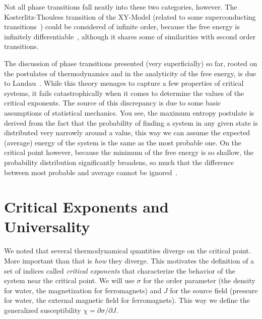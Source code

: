 Not all phase transitions fall neatly into these two categories, however. The
Kosterlitz-Thouless transition of the XY-Model (related to some superconducting
transitions~\cite{Resnick1981}) could be considered of infinite order, because
the free energy is infinitely differentiable~\cite{Kosterlitz1973}, although it
shares some of similarities with second order transitions.

The discussion of phase transitions presented (very superficially) so far,
rooted on the postulates of thermodynamics and in the analyticity of the free
energy, is due to Landau~\cite{Landau1969}. While this theory menages to
capture a few properties of critical systems, it fails catastrophically when it
comes to determine the values of the critical exponents. The source of this
discrepancy is due to some basic assumptions of statistical mechanics. You see,
the maximum entropy postulate is derived from the fact that the probability of
finding a system in any given state is distributed very narrowly around a
value, this way we can assume the expected (average) energy of the system is
the same as the most probable one. On the critical point however, because
the minimum of the free energy is so shallow, the probability distribution
significantly broadens, so much that the difference between most probable and
average cannot be ignored~\cite{Callen1985}.



\section{Critical Exponents and Universality}
\label{sec:universality}
\newcommand{\op}{\sigma}
\newcommand{\sfi}{J}

We noted that several thermodynamical quantities diverge on the critical point.
More important than that is \textit{how} they diverge. This motivates the
definition of a set of indices called \textit{critical exponents} that
characterize the behavior of the system near the critical point. We will use
$\op$ for the order parameter (the density for water, the magnetization for
ferromagnets) and $\sfi$ for the source field (pressure for water, the external
magnetic field for ferromagnets). This way we define the generalized
susceptibility $\chi=\partial\op/\partial \sfi$.

